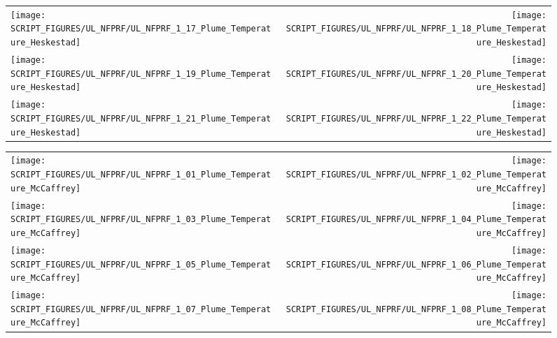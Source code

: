 \begin{figure}[!ht]
\begin{tabular*}{\textwidth}{l@{\extracolsep{\fill}}r}
\texttt{[image: SCRIPT\_FIGURES/UL\_NFPRF/UL\_NFPRF\_1\_17\_Plume\_Temperature\_Heskestad]} &
\texttt{[image: SCRIPT\_FIGURES/UL\_NFPRF/UL\_NFPRF\_1\_18\_Plume\_Temperature\_Heskestad]} \\
\texttt{[image: SCRIPT\_FIGURES/UL\_NFPRF/UL\_NFPRF\_1\_19\_Plume\_Temperature\_Heskestad]} &
\texttt{[image: SCRIPT\_FIGURES/UL\_NFPRF/UL\_NFPRF\_1\_20\_Plume\_Temperature\_Heskestad]} \\
\texttt{[image: SCRIPT\_FIGURES/UL\_NFPRF/UL\_NFPRF\_1\_21\_Plume\_Temperature\_Heskestad]} &
\texttt{[image: SCRIPT\_FIGURES/UL\_NFPRF/UL\_NFPRF\_1\_22\_Plume\_Temperature\_Heskestad]}
\end{tabular*}
\end{figure}

\begin{figure}[!ht]
\begin{tabular*}{\textwidth}{l@{\extracolsep{\fill}}r}
\texttt{[image: SCRIPT\_FIGURES/UL\_NFPRF/UL\_NFPRF\_1\_01\_Plume\_Temperature\_McCaffrey]} &
\texttt{[image: SCRIPT\_FIGURES/UL\_NFPRF/UL\_NFPRF\_1\_02\_Plume\_Temperature\_McCaffrey]} \\
\texttt{[image: SCRIPT\_FIGURES/UL\_NFPRF/UL\_NFPRF\_1\_03\_Plume\_Temperature\_McCaffrey]} &
\texttt{[image: SCRIPT\_FIGURES/UL\_NFPRF/UL\_NFPRF\_1\_04\_Plume\_Temperature\_McCaffrey]} \\
\texttt{[image: SCRIPT\_FIGURES/UL\_NFPRF/UL\_NFPRF\_1\_05\_Plume\_Temperature\_McCaffrey]} &
\texttt{[image: SCRIPT\_FIGURES/UL\_NFPRF/UL\_NFPRF\_1\_06\_Plume\_Temperature\_McCaffrey]} \\
\texttt{[image: SCRIPT\_FIGURES/UL\_NFPRF/UL\_NFPRF\_1\_07\_Plume\_Temperature\_McCaffrey]} &
\texttt{[image: SCRIPT\_FIGURES/UL\_NFPRF/UL\_NFPRF\_1\_08\_Plume\_Temperature\_McCaffrey]}
\end{tabular*}
\end{figure}

